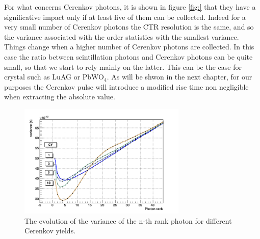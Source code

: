 For what concerns Cerenkov photons, it is shown in figure \ref{fig:} that they have a significative impact only if at least five of them can be collected. Indeed for a very small number of Cerenkov photons the CTR resolution is the same, and so the variance associated with the order statistics with the smallest variance.
Things change when a higher number of Cerenkov photons are collected. In this case the ratio between scintillation photons and Cerenkov photons can be quite small, so that we start to rely mainly on the latter.
This can be the case for crystal such as LuAG or PbWO$_{4}$. As will be shwon in the next chapter, for our purposes the Cerenkov pulse will introduce a modified rise time non negligible when extracting the absolute value.
\begin{figure}[htbp]
\begin{center}
\includegraphics[width=8cm]{../Pictures/Chapter_4/CER_photon_rank.png}
\end{center}
\caption[Rank variance - Cerenkov]{The evolution of the variance of the n-th rank photon for different Cerenkov yields.}
\label{fig:rise_rank}
\end{figure}

